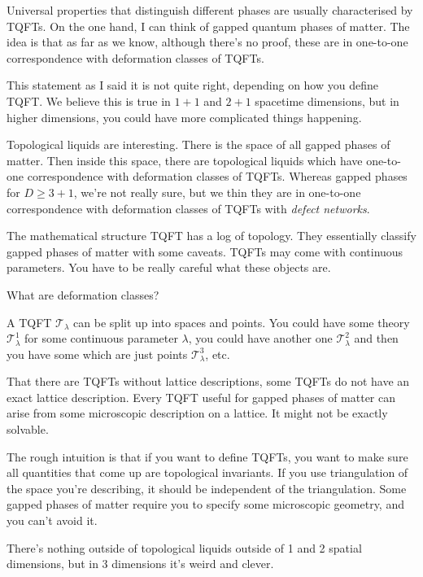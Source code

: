 Universal properties that distinguish different phases are usually characterised
by TQFTs.
On the one hand,
I can think of gapped quantum phases of matter.
The idea is that as far as we know, although there's no proof,
these are in one-to-one correspondence with deformation classes of TQFTs.

This statement as I said it is not quite right,
depending on how you define TQFT.
We believe this is true in $1+1$ and $2+1$ spacetime dimensions,
but in higher dimensions,
you could have more complicated things happening.

Topological liquids are interesting.
There is the space of all gapped phases of matter.
Then inside this space,
there are topological liquids
which have one-to-one correspondence with deformation classes of TQFTs.
Whereas gapped phases for $D\ge 3 + 1$,
we're not really sure,
but we thin they are in one-to-one correspondence with
deformation classes of TQFTs with \emph{defect networks}.

The mathematical structure TQFT has a log of topology.
They essentially classify gapped phases of matter with some caveats.
TQFTs may come with continuous parameters.
You have to be really careful what these objects are.

\begin{question}
    What are deformation classes?
\end{question}
A TQFT $\mathcal{T}_\lambda$ can be split up into spaces and points.
You could have some theory $\mathcal{T}^1_\lambda$ for some continuous parameter
$\lambda$,
you could have another one $\mathcal{T}^2_\lambda$
and then you have some which are just points $\mathcal{T}^3_\lambda$, etc.

That there are TQFTs without lattice descriptions,
some TQFTs do not have an exact lattice description.
Every TQFT useful for gapped phases of matter
can arise from some microscopic description on a lattice.
It might not be exactly solvable.

The rough intuition is that if you want to define TQFTs,
you want to make sure all quantities that come up are
topological invariants.
If you use triangulation of the space you're describing,
it should be independent of the triangulation.
Some gapped phases of matter require you to specify some microscopic geometry,
and you can't avoid it.

There's nothing outside of topological liquids outside of 1 and 2 spatial
dimensions,
but in 3 dimensions it's weird and clever.

